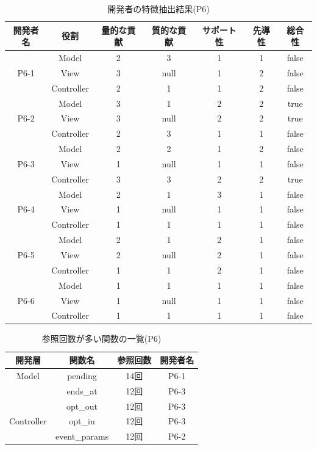 \documentclass{funthesis}
\begin{document}
\begin{table}[H]
  \begin{center}
\begin{tabular}{|c|c|c|c|c|c|c|}
\hline
開発者名 & 役割 & 量的な貢献 & 質的な貢献 & サポート性 & 先導性 & 総合性\\ \hline
& Model & 2 & 3 & 1 & 1 & false\\ \cline{2-7}
P6-1 & View & 3 & null & 1 & 2 & false\\ \cline{2-7}
& Controller & 2 & 1 & 1 & 2 & false \\ \hline \hline

& Model & 3 & 1 & 2 & 2 & true\\ \cline{2-7}
P6-2 & View & 3 & null & 2 & 2 & true\\ \cline{2-7}
& Controller & 2 & 3 & 1 & 1 & false \\ \hline \hline

& Model & 2 & 2 & 1 & 2 & false\\ \cline{2-7}
P6-3 & View & 1 & null & 1 & 1 & false\\ \cline{2-7}
& Controller & 3 & 3 & 2 & 2 & true \\ \hline \hline

& Model & 2 & 1 & 3 & 1 & false\\ \cline{2-7}
P6-4 & View & 1 & null& 1 & 1 & false\\ \cline{2-7}
& Controller & 1 & 1 & 1 & 1 & false \\ \hline \hline

& Model & 2 & 1 & 2 & 1 & false\\ \cline{2-7}
P6-5 & View & 2 & null& 2 & 1 & false\\ \cline{2-7}
& Controller & 1 & 1 & 2 & 1 & false \\ \hline \hline

& Model & 1 & 1 & 1 & 1 & false\\ \cline{2-7}
P6-6 & View & 1 & null & 1 & 1 & false\\ \cline{2-7}
& Controller & 1 & 1 & 1 & 1 & false \\ \hline
\end{tabular}
  \end{center}
  \caption{開発者の特徴抽出結果(P6)}    \label{sample}
\end{table}
\begin{table}[H]
  \begin{center}
\begin{tabular}{|c|c|c|c|}\hline
開発層&関数名&参照回数&開発者名\\ \hline
Model& pending & 14回 & P6-1 \\ \cline{2-4}
& ends\_at & 12回 & P6-3 \\ \cline{2-4}\hline\hline

& opt\_out & 12回 & P6-3 \\ \cline{2-4}
Controller& opt\_in & 12回 & P6-3 \\ \cline{2-4}
& event\_params & 12回 & P6-2 \\ \cline{2-4}\hline
\end{tabular}    
\caption{参照回数が多い関数の一覧(P6)}    \label{sample}
  \end{center}
\end{table}
\end{document}
